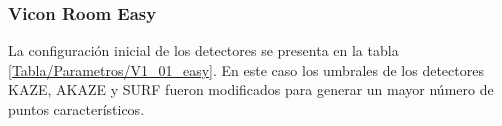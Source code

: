 %
%
%
%
%
%
%
%
%
%
%
%
%
%
%
%


\subsubsection{Vicon Room Easy}

La configuración inicial de los detectores se presenta en la tabla \ref{Tabla/Parametros/V1_01_easy}. En este caso los umbrales de los detectores KAZE, AKAZE y SURF fueron modificados para generar un mayor número de puntos característicos.

